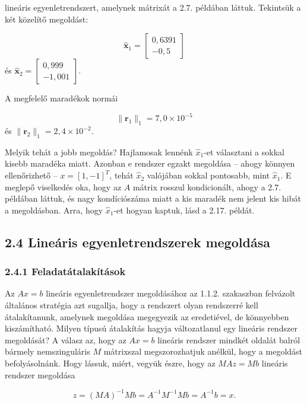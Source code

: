 \documentclass[
  magyar,
  11pt]{article}
\providecommand{\boldsymbol}[1]{\mathbf{#1}}
\begin{document}
lineáris egyenletrendszert, amelynek mátrixát a 2.7. példában láttuk.
Tekintsük a két közelítő megoldást:

\[\hat{\boldsymbol{x}}_1 = \begin{bmatrix} 0{,}6391 \\ -0{,}5 \end{bmatrix}\]
és
\(\hat{\boldsymbol{x}}_2 = \begin{bmatrix} 0{,}999 \\ -1{,}001 \end{bmatrix}\).

A megfelelő maradékok normái

\[\|\boldsymbol{r}_1\|_1 = 7{,}0 \times 10^{-5}\] és
\(\|\boldsymbol{r}_2\|_1 = 2{,}4 \times 10^{-2}\).

Melyik tehát a jobb megoldás? Hajlamosak lennénk \(\hat{x}_1\)-et
választani a sokkal kisebb maradéka miatt. Azonban e rendszer egzakt
megoldása -- ahogy könnyen ellenőrizhető -- \(x = [1, -1]^T\), tehát
\(\hat{x}_2\) valójában sokkal pontosabb, mint \(\hat{x}_1\). E meglepő
viselkedés oka, hogy az \(A\) mátrix rosszul kondicionált, ahogy a 2.7.
példában láttuk, és nagy kondíciószáma miatt a kis maradék nem jelent
kis hibát a megoldásban. Arra, hogy \(\hat{x}_1\)-et hogyan kaptuk, lásd
a 2.17. példát.

\subsection{2.4 Lineáris egyenletrendszerek
megoldása}\label{lineuxe1ris-egyenletrendszerek-megolduxe1sa}

\subsubsection{2.4.1
Feladatátalakítások}\label{feladatuxe1talakuxedtuxe1sok}

Az \(Ax = b\) lineáris egyenletrendszer megoldásához az 1.1.2.
szakaszban felvázolt általános stratégia azt sugallja, hogy a rendszert
olyan rendszerré kell átalakítanunk, amelynek megoldása megegyezik az
eredetiével, de könnyebben kiszámítható. Milyen típusú átalakítás hagyja
változatlanul egy lineáris rendszer megoldását? A válasz az, hogy az
\(Ax = b\) lineáris rendszer mindkét oldalát balról bármely
nemszinguláris \(M\) mátrixszal megszorozhatjuk anélkül, hogy a
megoldást befolyásolnánk. Hogy lássuk, miért, vegyük észre, hogy az
\(MAz = Mb\) lineáris rendszer megoldása

\[z = (MA)^{-1}Mb = A^{-1}M^{-1}Mb = A^{-1}b = x.\]
\end{document}

